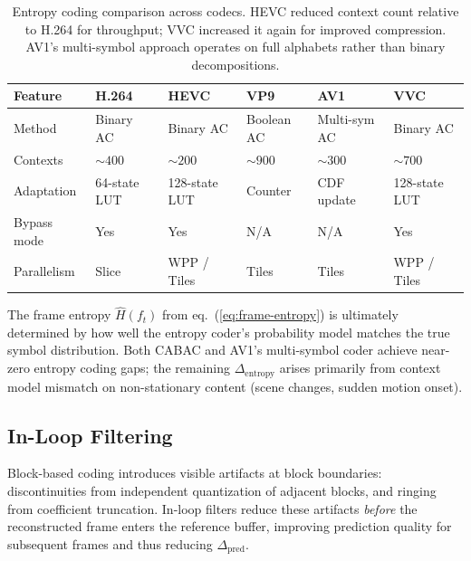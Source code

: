 \begin{table}[ht]
\centering
\small
\renewcommand{\arraystretch}{1.4}
\begin{tabularx}{\textwidth}{lXXXXX}
\toprule
\textbf{Feature} & \textbf{H.264} & \textbf{HEVC} & \textbf{VP9}
  & \textbf{AV1} & \textbf{VVC} \\
\midrule
Method &
  Binary AC &
  Binary AC &
  Boolean AC &
  Multi-sym AC &
  Binary AC \\
Contexts &
  ${\sim}400$ &
  ${\sim}200$ &
  ${\sim}900$ &
  ${\sim}300$ &
  ${\sim}700$ \\
Adaptation &
  64-state LUT &
  128-state LUT &
  Counter &
  CDF update &
  128-state LUT \\
Bypass mode &
  Yes &
  Yes &
  N/A &
  N/A &
  Yes \\
Parallelism &
  Slice &
  WPP / Tiles &
  Tiles &
  Tiles &
  WPP / Tiles \\
\bottomrule
\end{tabularx}
\caption{Entropy coding comparison across codecs. HEVC reduced context
  count relative to H.264 for throughput; VVC increased it again for
  improved compression. AV1's multi-symbol approach operates on full
  alphabets rather than binary decompositions.}
\label{tab:entropy-coding}
\end{table}

The frame entropy $\hat{H}(f_t)$ from eq.~(\ref{eq:frame-entropy}) is
ultimately determined by how well the entropy coder's probability model
matches the true symbol distribution. Both CABAC and AV1's multi-symbol
coder achieve near-zero entropy coding gaps; the remaining
$\Delta_{\text{entropy}}$ arises primarily from context model mismatch on
non-stationary content (scene changes, sudden motion onset).

\subsection{In-Loop Filtering}
\label{sec:filtering}

Block-based coding introduces visible artifacts at block boundaries:
discontinuities from independent quantization of adjacent blocks, and
ringing from coefficient truncation. In-loop filters reduce these artifacts
\emph{before} the reconstructed frame enters the reference buffer, improving
prediction quality for subsequent frames and thus reducing
$\Delta_{\text{pred}}$.

